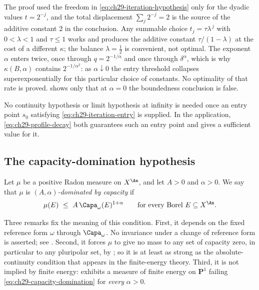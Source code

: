 \begin{remark}
\label{rem:ch29-iteration-constants}
The proof used the freedom in \eqref{eq:ch29-iteration-hypothesis} only for
the dyadic values $t=2^{-j}$, and the total displacement $\sum_j2^{-j}=2$
is the source of the additive constant $2$ in the conclusion.  Any
summable choice $t_j=\tau\lambda^{\,j}$ with $0<\lambda<1$ and
$\tau\leq1$ works and produces the additive constant
$\tau/(1-\lambda)$ at the cost of a different $\kappa$; the balance
$\lambda=\tfrac12$ is convenient, not optimal.  The exponent
$\alpha$ enters twice, once through $q=2^{-1/\alpha}$ and once through
$\delta^\alpha$, which is why $\kappa(B,\alpha)$ contains
$2^{-1/\alpha^2}$: as $\alpha\downarrow0$ the entry threshold collapses
superexponentially for this particular choice of constants.  No
optimality of that rate is proved.   shows only
that at $\alpha=0$ the boundedness conclusion is false.
\end{remark}

\begin{remark}
\label{rem:ch29-iteration-hypotheses}
No continuity hypothesis or limit hypothesis at infinity is needed once
an entry point $s_0$ satisfying \eqref{eq:ch29-iteration-entry} is
supplied.  In the application, \eqref{eq:ch29-profile-decay} both
guarantees such an entry point and gives a sufficient value for it.
\end{remark}

\subsection{The capacity-domination hypothesis}
\label{sec:ch29-domination-hypothesis}

\begin{definition}
\label{def:ch29-capacity-domination}
Let $\mu$ be a positive Radon measure on $X^{\An}$, and let
$A>0$ and $\alpha>0$.  We say that $\mu$ is \emph{$(A,\alpha)$-dominated
by capacity} if
\begin{equation}
\label{eq:ch29-capacity-domination}
 \mu(E)\ \leq\ A\,\Capa_\omega(E)^{1+\alpha}
 \qquad\text{for every Borel }E\subseteq X^{\An}.
\end{equation}
\end{definition}

Three remarks fix the meaning of this condition.  First, it depends on
the fixed reference form $\omega$ through $\Capa_\omega$.
No invariance under a change of reference form is asserted; see
.  Second, it forces $\mu$ to give no
mass to any set of capacity zero, in particular to any pluripolar set, by
; so it is at least as strong as the
absolute-continuity condition that appears in the finite-energy theory.
Third, it is not implied by finite energy:  exhibits
a measure of finite energy on $\mathbf P^1$ failing
\eqref{eq:ch29-capacity-domination} for \emph{every} $\alpha>0$.

